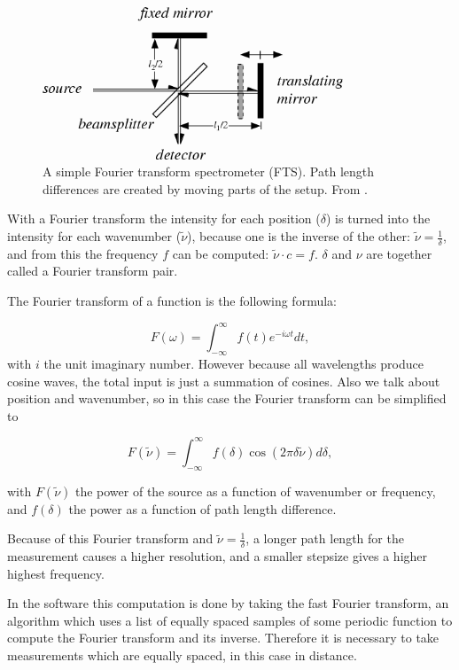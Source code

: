 \begin{figure}
 \begin{center}
  \includegraphics[width=0.8\textwidth]{figures/fts.png}
  \caption{A simple Fourier transform spectrometer (FTS). Path length differences are created by moving parts of the setup.  From \cite{wolf}.}
  \label{fig:fts}
 \end{center}
\end{figure}


With a Fourier transform the intensity for each position ($\delta$) is turned into the intensity for each wavenumber ($\tilde{\nu}$), because one is the inverse of the other: $\tilde{\nu} = \frac{1}{\delta}$, and from this the frequency $f$ can be computed: $\tilde{\nu}\cdot c=f$. $\delta$ and $\nu$ are together called a Fourier transform pair.

The Fourier transform of a function is the following formula:

\[
 F(\omega)=\int_{-\infty}^{\infty}f(t)e^{-i\omega t}dt,
\]
with $i$ the unit imaginary number. However because all wavelengths produce cosine waves, the total input is just a summation of cosines. Also we talk about position and wavenumber, so in this case the Fourier transform can be simplified to

\[
 F(\tilde{\nu}) = \int_{-\infty}^{\infty}f(\delta)\cos(2\pi\delta\tilde{\nu})d\delta,
\]

with $F(\tilde{\nu})$ the power of the source as a function of wavenumber or frequency, and $f(\delta)$ the power as a function of path length difference.

Because of this Fourier transform and $\tilde{\nu} = \frac{1}{\delta}$, a longer path length for the measurement causes a higher resolution, and a smaller stepsize gives a higher highest frequency.

In the software this computation is done by taking the fast Fourier transform, an algorithm which uses a list of equally spaced samples of some periodic function to compute the Fourier transform and its inverse. Therefore it is necessary to take measurements which are equally spaced, in this case in distance.

